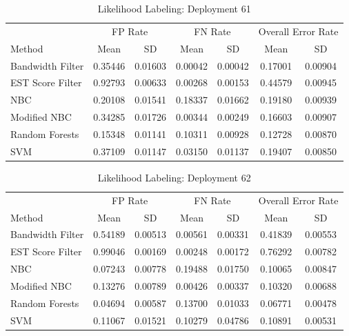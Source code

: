 \documentclass[twoside]{article}
\begin{document}
\begin{table}[H]
\caption{Likelihood Labeling: Deployment 61}
\centering
\begin{tabular}{lcccccc}
\toprule
\multicolumn{1}{c}{ } 
&\multicolumn{2}{c}{FP Rate } 
&\multicolumn{2}{c}{FN Rate } 
&\multicolumn{2}{c}{Overall Error Rate } \\
\cmidrule(r){2-3}
\cmidrule(r){4-5}
\cmidrule(r){6-7}
Method& Mean & SD & Mean & SD & Mean & SD \\
\midrule
Bandwidth Filter & 0.35446 & 0.01603 & 0.00042 & 0.00042 & 0.17001 & 0.00904 \\
EST Score Filter & 0.92793 & 0.00633 & 0.00268 & 0.00153 & 0.44579 & 0.00945 \\
NBC & 0.20108 & 0.01541 & 0.18337 & 0.01662 & 0.19180 & 0.00939 \\
Modified NBC & 0.34285 & 0.01726 & 0.00344 & 0.00249 & 0.16603 & 0.00907 \\
Random Forests & 0.15348 & 0.01141 & 0.10311 & 0.00928 & 0.12728 & 0.00870 \\
SVM & 0.37109 & 0.01147 & 0.03150 & 0.01137 & 0.19407 & 0.00850 \\
\bottomrule
\end{tabular}
\end{table}

\begin{table}[H]
\caption{Likelihood Labeling: Deployment 62}
\centering
\begin{tabular}{lcccccc}
\toprule
\multicolumn{1}{c}{ } 
&\multicolumn{2}{c}{FP Rate } 
&\multicolumn{2}{c}{FN Rate } 
&\multicolumn{2}{c}{Overall Error Rate } \\
\cmidrule(r){2-3}
\cmidrule(r){4-5}
\cmidrule(r){6-7}
Method& Mean & SD & Mean & SD & Mean & SD \\
\midrule
Bandwidth Filter & 0.54189 & 0.00513 & 0.00561 & 0.00331 & 0.41839 & 0.00553 \\
EST Score Filter & 0.99046 & 0.00169 & 0.00248 & 0.00172 & 0.76292 & 0.00782 \\
NBC & 0.07243 & 0.00778 & 0.19488 & 0.01750 & 0.10065 & 0.00847 \\
Modified NBC & 0.13276 & 0.00789 & 0.00426 & 0.00337 & 0.10320 & 0.00688 \\
Random Forests & 0.04694 & 0.00587 & 0.13700 & 0.01033 & 0.06771 & 0.00478 \\
SVM & 0.11067 & 0.01521 & 0.10279 & 0.04786 & 0.10891 & 0.00531 \\
\bottomrule
\end{tabular}
\end{table}
\end{document}
